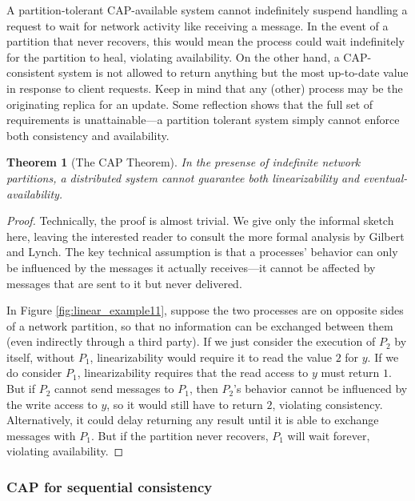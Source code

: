 \documentclass[]             %
{NASA}                       %
\newtheorem{theorem}{Theorem}[section]
\theoremstyle{definition}
\begin{document}
A partition-tolerant CAP-available system cannot indefinitely suspend
handling a request to wait for network activity like receiving a
message. In the event of a partition that never recovers, this would
mean the process could wait indefinitely for the partition to heal,
violating availability. On the other hand, a CAP-consistent system is
not allowed to return anything but the most up-to-date value in response
to client requests. Keep in mind that any (other) process may be the
originating replica for an update. Some reflection shows that the full
set of requirements is unattainable---a partition tolerant system simply
cannot enforce both consistency and availability.

\begin{theorem}[The CAP Theorem]
    \label{thm:cap}
    In the presense of indefinite network partitions, a distributed system
    cannot guarantee both linearizability and eventual-availability.
\end{theorem}
\begin{proof}
Technically, the proof is almost trivial. We give only the informal
sketch here, leaving the interested reader to consult the more formal
analysis by Gilbert and Lynch. The key technical assumption is that a
processes' behavior can only be influenced by the messages it actually
receives---it cannot be affected by messages that are sent to it but
never delivered.

In Figure \ref{fig:linear_example11}, suppose the two processes are on
opposite sides of a network partition, so that no information can be
exchanged between them (even indirectly through a third party). If we
just consider the execution of $P_2$ by itself, without $P_1$,
linearizability would require it to read the value $2$ for $y$. If we
do consider $P_1$, linearizability requires that the read access to
$y$ must return $1$. But if $P_2$ cannot send messages to $P_1$, then
$P_2$'s behavior cannot be influenced by the write access to $y$, so
it would still have to return $2$, violating
consistency. Alternatively, it could delay returning any result until
it is able to exchange messages with $P_1$. But if the partition never
recovers, $P_1$ will wait forever, violating availability.
\end{proof}

\hypertarget{cap-for-sequential-consistency}{%
\subsubsection{CAP for sequential
consistency}\label{cap-for-sequential-consistency}}
\end{document}
